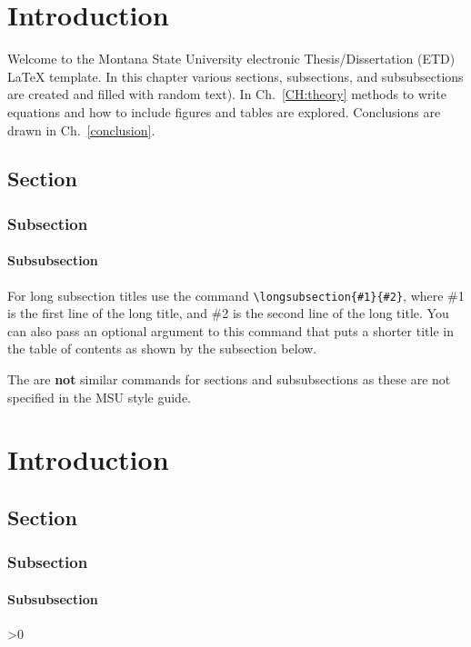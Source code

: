 \chapter{Introduction}\label{CH:introduction}
Welcome to the Montana State University electronic Thesis/Dissertation (ETD) \LaTeX{} template.  In this chapter various sections, subsections, and subsubsections are created and filled with random text).  In Ch.~\ref{CH:theory} methods to write equations and how to include figures and tables are explored. Conclusions are drawn in Ch.~\ref{conclusion}.


\section{Section}\label{Sect:test}
\lipsum[1] %

\subsection{Subsection}\label{Sect:testsub}
\lipsum[2] %

\subsubsection{Subsubsection}\label{Sect:testsubsub}
\lipsum[3] %

\label{Sect:longsub}
For long subsection titles use the command \verb|\longsubsection{#1}{#2}|, where \#1 is the first line of the long title, and \#2 is the second line of the long title. You can also pass an optional argument to this command that puts a shorter title in the table of contents as shown by the subsection below.

\label{Sect:longsub2}
The are \textbf{not} similar commands for sections and subsubsections as these are not specified in the MSU style guide.  

\chapter{Introduction}

\newcount\loopcount
{}
\loop
  \section{Section}
  \lipsum[1] %

  \subsection{Subsection}
  \lipsum[2] %

  \subsubsection{Subsubsection}
  \lipsum[3] %

\advance{}
\ifnum\loopcount>0
\repeat 
